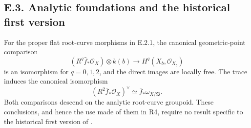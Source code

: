 \subsection{E.3. Analytic foundations and the historical first version}
\begin{proposition}
For the proper flat root-curve morphisms in E.2.1, the canonical
geometric-point comparison
\[
 (R^q\bar f_*\mathcal O_X)\otimes k(b)
 \longrightarrow H^q(X_b,\mathcal O_{X_b})
\]
is an isomorphism for $q=0,1,2$, and the direct images are locally
free.  The trace induces the canonical isomorphism
\[
 (R^2\bar f_*\mathcal O_X)^\vee
 \simeq\bar f_*\omega_{X/\mathfrak B}.
\]
Both comparisons descend on the analytic root-curve groupoid.
These conclusions, and hence the use made of them in R4, require
no result specific to the historical first version of
\cite{DGKXv1push}.
\end{proposition}
